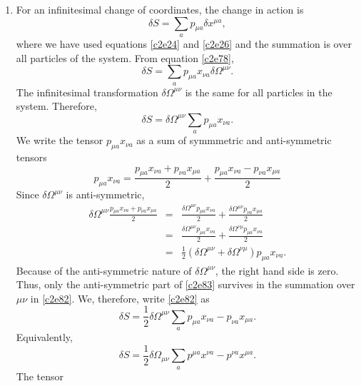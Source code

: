\begin{enumerate}
\item For an infinitesimal change of coordinates, the change in action is
\begin{equation}\label{c2e80}
\delta S = \sum_{a} p_{\mu a}\delta x^{\mu a},
\end{equation}
where we have used equations \eqref{c2e24} and \eqref{c2e26} and the summation
is over all particles of the system. From equation \eqref{c2e78},
\begin{equation}\label{c2e81}
\delta S = \sum_{a} p_{\mu a}x_{\nu a}\delta\Omega^{\mu\nu}.
\end{equation}
The infinitesimal transformation $\delta\Omega^{\mu\nu}$ is the same for all
particles in the system. Therefore,
\begin{equation}\label{c2e82}
\delta S = \delta\Omega^{\mu\nu}\sum_{a} p_{\mu a}x_{\nu a}.
\end{equation}
We write the tensor $p_{\mu a}x_{\nu a}$ as a sum of symmmetric and anti-symmetric
tensors
\begin{equation}\label{c2e83}
p_{\mu a}x_{\nu a} = \frac{p_{\mu a}x_{\nu a} + p_{\nu a}x_{\mu a}}{2} +
\frac{p_{\mu a}x_{\nu a} - p_{\nu a}x_{\mu a}}{2}
\end{equation}
Since $\delta\Omega^{\mu\nu}$ is anti-symmetric,
\begin{eqnarray*}
\delta\Omega^{\mu\nu}\frac{p_{\mu a}x_{\nu a} + p_{\nu a}x_{\mu a}}{2} &=&
\frac{\delta\Omega^{\mu\nu}p_{\mu a}x_{\nu a}}{2} + 
\frac{\delta\Omega^{\mu\nu}p_{\nu a}x_{\mu a}}{2} \\
 &=& \frac{\delta\Omega^{\mu\nu}p_{\mu a}x_{\nu a}}{2} + 
\frac{\delta\Omega^{\nu\mu}p_{\mu a}x_{\nu a}}{2} \\
 &=& \frac{1}{2}(\delta\Omega^{\mu\nu} + \delta\Omega^{\nu\mu})p_{\mu a}x_{\nu a}.
\end{eqnarray*}
Because of the anti-symmetric nature of $\delta\Omega^{\mu\nu}$, the right hand 
side is zero. Thus, only the anti-symmetric part of \eqref{c2e83} survives in
the summation over $\mu\nu$ in \eqref{c2e82}. We, therefore, write \eqref{c2e82}
as
\begin{equation}\label{c2e84}
\delta S = \frac{1}{2}\delta\Omega^{\mu\nu}\sum_{a}p_{\mu a}x_{\nu a} - p_{\nu a}x_{\mu a}.
\end{equation}
Equivalently,
\begin{equation}\label{c2e85}
\delta S = \frac{1}{2}\delta\Omega_{\mu\nu}\sum_{a}p^{\mu a}x^{\nu a} - p^{\nu a}x^{\mu a}.
\end{equation}
The tensor
\begin{equation}\label{c2e86}

\end{equation}
\end{enumerate}
